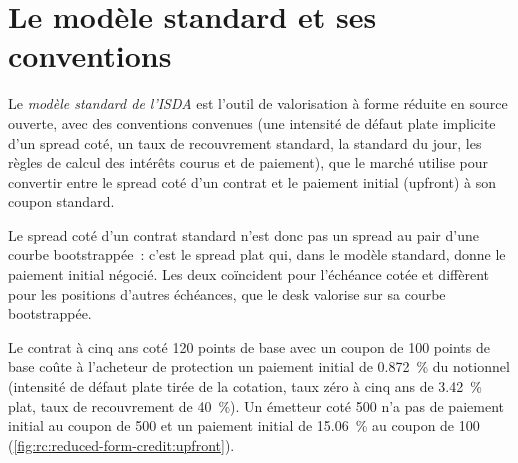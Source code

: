 \section{Le modèle standard et ses conventions}

\begin{definition}\label{def:rc:reduced-form-credit:isda}
Le \emph{modèle standard de l'ISDA} est l'outil de valorisation à forme réduite en source ouverte,
avec des conventions convenues (une intensité de défaut plate implicite d'un spread coté, un taux de recouvrement standard,
la  standard du jour, les règles de calcul des intérêts courus et de paiement),
que le marché utilise pour convertir entre le spread coté d'un contrat et le
paiement initial (upfront) à son coupon standard.
\end{definition}

Le spread coté d'un contrat standard n'est donc pas un spread au pair d'une courbe bootstrappée~:
c'est le spread plat qui, dans le modèle standard, donne le paiement initial négocié. Les deux
coïncident pour l'échéance cotée et diffèrent pour les positions d'autres échéances, que le
desk valorise sur sa courbe bootstrappée.

\begin{example}\label{ex:rc:reduced-form-credit:upfront}
Le contrat à cinq ans coté 120 points de base avec un coupon de 100 points de base coûte
à l'acheteur de protection un paiement initial de 0.872~\% du notionnel (intensité de défaut plate tirée de la cotation, taux zéro
à cinq ans de 3.42~\% plat, taux de recouvrement de 40~\%). Un émetteur coté 500 n'a pas de paiement initial au coupon de 500 et
un paiement initial de 15.06~\% au coupon de 100 (\cref{fig:rc:reduced-form-credit:upfront}).
\end{example}

